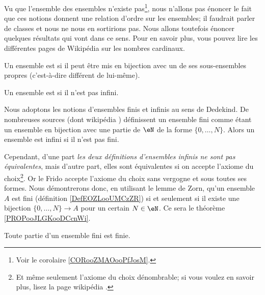 \begin{normaltext}\label{NORooPasDeClasses}
	Vu que l'ensemble des ensembles n'existe pas\footnote{Voir le corolaire \ref{CORooZMAOooPfJosM}.}, nous n'allons pas énoncer le fait que ces notions donnent une relation d'ordre sur les ensembles; il faudrait parler de classes et nous ne nous en sortirions pas. Nous allons toutefois énoncer quelques résultats qui vont dans ce sens. Pour en savoir plus, vous pouvez lire les différentes pages de Wikipédia sur les nombres cardinaux.
\end{normaltext}

\begin{definition}      \label{DefEOZLooUMCzZR}
	Un ensemble est  si il peut être mis en bijection avec un de ses sous-ensembles propres (c'est-à-dire différent de lui-même).

	Un ensemble est  si il n'est pas infini.
\end{definition}

\begin{normaltext}\label{NORooQuelleDefEnsInfini}
	Nous adoptons les notions d'ensembles finis et infinis au sens de Dedekind. De nombreuses sources (dont wikipédia \cite{BIBooJYONooLCnCtQ,BIBooPARTooZDteDq}) définissent un ensemble fini comme étant un ensemble en bijection avec une partie de \( \eN\) de la forme \( \{ 0,\ldots, N \}\). Alors un ensemble est infini si il n'est pas fini.

	Cependant, d'une part \emph{les deux définitions d'ensembles infinis ne sont pas équivalentes}, mais d'autre part, elles sont équivalentes si on accepte l'axiome du choix\footnote{Et même seulement l'axiome du choix dénombrable; si vous voulez en savoir plus, lisez la page wikipédia \cite{BIBooSPDRooHTpBqh}.}. Or le Frido accepte l'axiome du choix sans vergogne et sous toutes ses formes. Nous démontrerons donc, en utilisant le lemme de Zorn, qu'un ensemble \( A\) est fini (définition \ref{DefEOZLooUMCzZR}) si et seulement si il existe une bijection \( \{ 0,\ldots, N \}\to A\) pour un certain \( N\in \eN\). Ce sera le théorème  \ref{PROPooJLGKooDCcnWi}.
\end{normaltext}


\begin{lemma}       \label{LEMooTUIRooEXjfDY}
	Toute partie d'un ensemble fini est finie.
\end{lemma}

